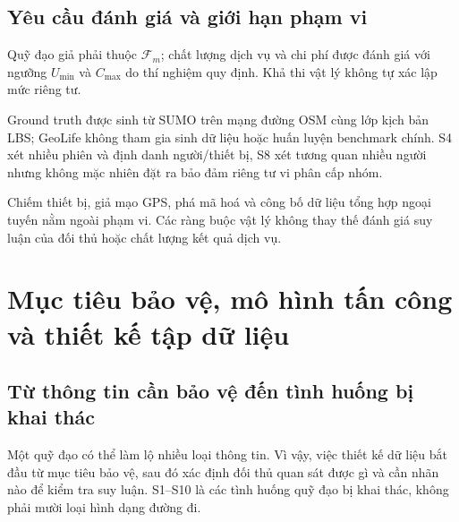 \documentclass[12pt,a4paper,oneside]{report}
\begin{document}
\section{Yêu cầu đánh giá và giới hạn phạm vi}

Quỹ đạo giả phải thuộc $\mathcal F_m$; chất lượng dịch vụ và chi phí được đánh giá với ngưỡng $U_{\min}$ và $C_{\max}$ do thí nghiệm quy định. Khả thi vật lý không tự xác lập mức riêng tư.

Ground truth được sinh từ SUMO trên mạng đường OSM cùng lớp kịch bản LBS; GeoLife không tham gia sinh dữ liệu hoặc huấn luyện benchmark chính. S4 xét nhiều phiên và định danh người/thiết bị, S8 xét tương quan nhiều người nhưng không mặc nhiên đặt ra bảo đảm riêng tư vi phân cấp nhóm.

Chiếm thiết bị, giả mạo GPS, phá mã hoá và công bố dữ liệu tổng hợp ngoại tuyến nằm ngoài phạm vi. Các ràng buộc vật lý không thay thế đánh giá suy luận của đối thủ hoặc chất lượng kết quả dịch vụ.

\chapter{Mục tiêu bảo vệ, mô hình tấn công và thiết kế tập dữ liệu}
\label{ch:threat}
\label{ch:targets}
\label{ch:scenarios}
\label{ch:experiment}

\section{Từ thông tin cần bảo vệ đến tình huống bị khai thác}

Một quỹ đạo có thể làm lộ nhiều loại thông tin. Vì vậy, việc thiết kế dữ liệu bắt đầu từ mục tiêu bảo vệ, sau đó xác định đối thủ quan sát được gì và cần nhãn nào để kiểm tra suy luận. S1--S10 là các tình huống quỹ đạo bị khai thác, không phải mười loại hình dạng đường đi.
\end{document}

